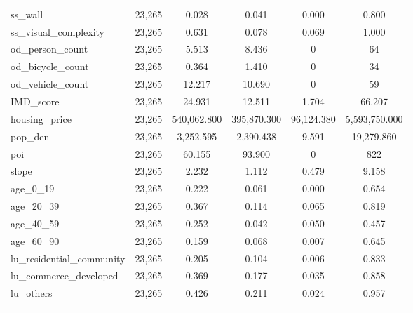 \begin{table}[!htbp]
\begin{tabular}{@{\extracolsep{5pt}}lccccc}
ss\_wall & 23,265 & 0.028 & 0.041 & 0.000 & 0.800 \\ 
ss\_visual\_complexity & 23,265 & 0.631 & 0.078 & 0.069 & 1.000 \\ 
od\_person\_count & 23,265 & 5.513 & 8.436 & 0 & 64 \\ 
od\_bicycle\_count & 23,265 & 0.364 & 1.410 & 0 & 34 \\ 
od\_vehicle\_count & 23,265 & 12.217 & 10.690 & 0 & 59 \\ 
IMD\_score & 23,265 & 24.931 & 12.511 & 1.704 & 66.207 \\ 
housing\_price & 23,265 & 540,062.800 & 395,870.300 & 96,124.380 & 5,593,750.000 \\ 
pop\_den & 23,265 & 3,252.595 & 2,390.438 & 9.591 & 19,279.860 \\ 
poi & 23,265 & 60.155 & 93.900 & 0 & 822 \\ 
slope & 23,265 & 2.232 & 1.112 & 0.479 & 9.158 \\ 
age\_0\_19 & 23,265 & 0.222 & 0.061 & 0.000 & 0.654 \\ 
age\_20\_39 & 23,265 & 0.367 & 0.114 & 0.065 & 0.819 \\ 
age\_40\_59 & 23,265 & 0.252 & 0.042 & 0.050 & 0.457 \\ 
age\_60\_90 & 23,265 & 0.159 & 0.068 & 0.007 & 0.645 \\ 
lu\_residential\_community & 23,265 & 0.205 & 0.104 & 0.006 & 0.833 \\ 
lu\_commerce\_developed & 23,265 & 0.369 & 0.177 & 0.035 & 0.858 \\ 
lu\_others & 23,265 & 0.426 & 0.211 & 0.024 & 0.957 \\ 
\hline \\[-1.8ex] 
\end{tabular} 
\end{table} 
